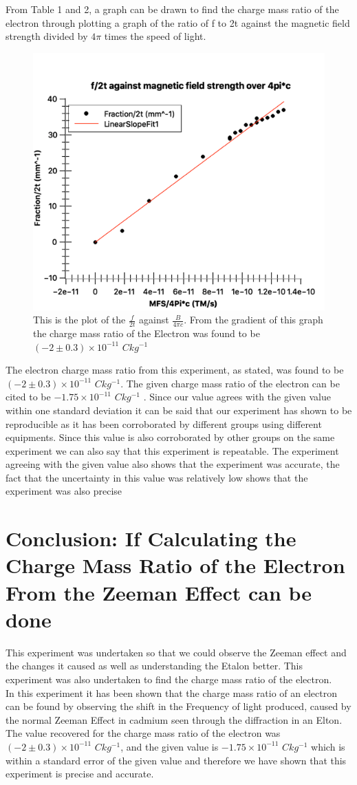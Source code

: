 \documentclass[a4paper,11pt]{article}
\begin{document}
From Table 1 and 2, a graph can be drawn to find the charge mass ratio of the electron through plotting a graph of the ratio of f to 2t against the magnetic field strength divided by $4\pi$ times the speed of light.
\begin{figure}[hbt!]
    \centering
    \includegraphics[width=0.35\columnwidth]{Images/Pic for Lab I Guess.png}
    \caption{This is the plot of the $\frac{f}{2t}$ against $\frac{B}{4\pi c}$. From the gradient of this graph the charge mass ratio of the Electron was found to be $(-2\pm0.3) \times10^{-11}$ $Ckg^{-1}$}
    \label{fig:Final Graph}
\end{figure}

The electron charge mass ratio from this experiment, as stated, was found to be $(-2\pm0.3) \times10^{-11}$ $Ckg^{-1}$. The given charge mass ratio of the electron can be cited to be $-1.75 \times10^{-11}$ $Ckg^{-1}$ \cite{Electron}. Since our value agrees with the given value within one standard deviation it can be said that our experiment has shown to be reproducible as it has been corroborated by different groups using different equipments. Since this value is also corroborated by other groups on the same experiment we can also say that this experiment is repeatable. The experiment agreeing with the given value also shows that the experiment was accurate, the fact that the uncertainty in this value was relatively low shows that the experiment was also precise

\section{Conclusion: If Calculating the Charge Mass Ratio of the Electron From the Zeeman Effect can be done}
This experiment was undertaken so that we could observe the Zeeman effect and the changes it caused as well as understanding the Etalon better. This experiment was also undertaken to find the charge mass ratio of the electron.\\

In this experiment it has been shown that the charge mass ratio of an electron can be found by observing the shift in the Frequency of light produced, caused by the normal Zeeman Effect in cadmium seen through the diffraction in an Elton. The value recovered for the charge mass ratio of the electron was $(-2\pm0.3) \times10^{-11}$ $Ckg^{-1}$, and the given value is $-1.75 \times10^{-11}$ $Ckg^{-1}$ \cite{Electron} which is within a standard error of the given value and therefore we have shown that this experiment is precise and accurate.\\
\end{document}

